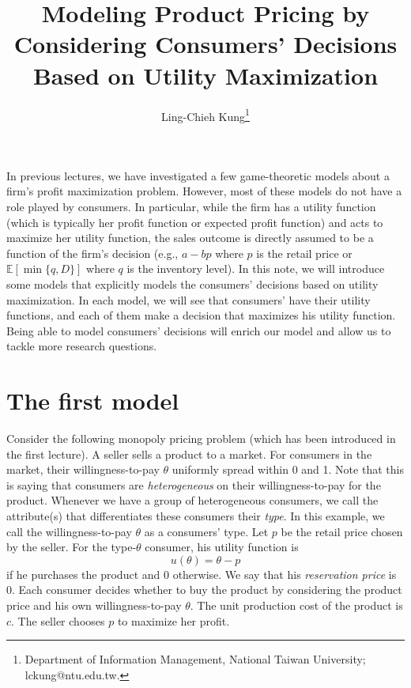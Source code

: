 \documentclass[11pt,a4paper]{article}
\title{Modeling Product Pricing by Considering 
Consumers' Decisions Based on Utility Maximization}
\author{Ling-Chieh Kung\thanks{Department of Information Management, National Taiwan University; lckung@ntu.edu.tw.}}
\date{}
\begin{document}
\maketitle












In previous lectures, we have investigated a few game-theoretic models
about a firm's profit maximization problem. 
However, most of these models do not have a role played by consumers. 
In particular, while the firm has a utility function (which is typically 
her profit function or expected profit function) and acts to maximize her 
utility function, the sales outcome is directly assumed to be a function of the 
firm's decision (e.g., $a - bp$ where $p$ is the retail price or 
$\mathbb{E}[\min\{q, D\}]$ where $q$ is the inventory level). 
In this note, we will introduce some models that explicitly models the 
consumers' decisions based on utility maximization. 
In each model, we will see that consumers' have their utility functions, 
and each of them make a decision that maximizes his utility function. 
Being able to model consumers' decisions will enrich our model and 
allow us to tackle more research questions. 







\section{The first model}

Consider the following monopoly pricing problem (which has been introduced 
in the first lecture). A seller sells a product to a market. For consumers 
in the market, their willingness-to-pay $\theta$ uniformly spread within 0 and 1. 
Note that this is saying that consumers are \textit{heterogeneous} on 
their willingness-to-pay for the product. Whenever we have a group of 
heterogeneous consumers, we call the attribute(s) that differentiates 
these consumers their \textit{type}. In this example, 
we call the willingness-to-pay $\theta$ as a consumers' type. 
Let $p$ be the retail price chosen by the seller. 
For the type-$\theta$ consumer, his utility function is 
\[
	u(\theta) = \theta - p 
\]
if he purchases the product and 0 otherwise. 
We say that his \textit{reservation price} is 0. 
Each consumer decides whether to buy the product by considering the product 
price and his own willingness-to-pay $\theta$. 
The unit production cost of the product is $c$. 
The seller chooses $p$ to maximize her profit. 
\end{document}

